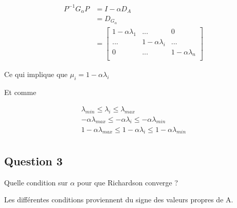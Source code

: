 \documentclass[11pt]{article}
\begin{document}
\begin{equation*}
  \begin{split}
    P^{-1}G_{\alpha}P & = I - \alpha D_A \\
    & = D_{G_{\alpha}} \\
    & = \left[
      \begin{array}{ccc}
        1 - \alpha \lambda_1 & ... & 0 \\
        ... & 1 - \alpha \lambda_i & ... \\
        0 & ... & 1 - \alpha \lambda_n \\
      \end{array}
      \right]
  \end{split}
\end{equation*}

Ce qui implique que $\mu_i = 1 - \alpha \lambda_i$\newline

\vspace{5mm}

Et comme

\begin{gather*}
    \lambda_{min} \le \lambda_i \le \lambda_{max} \\
    - \alpha \lambda_{max} \le - \alpha \lambda_i \le - \alpha
    \lambda_{min} \\
    1 - \alpha \lambda_{max} \le 1 - \alpha \lambda_i \le 1 - \alpha
    \lambda_{min} \\
\end{gather*}

\subsection{Question 3}

Quelle condition sur $\alpha$ pour que Richardson converge ?\newline

\vspace{5mm}

Les différentes conditions proviennent du signe des valeurs propres de
A.
\end{document}
